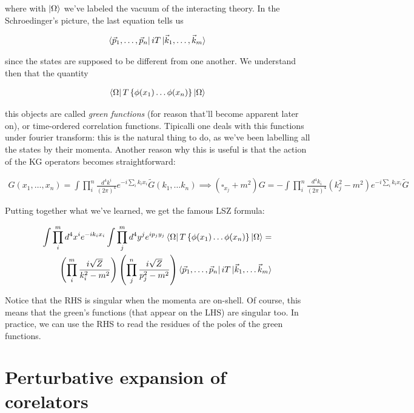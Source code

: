 \documentclass{report}
\begin{document}
where with \(\ket{\Omega}\) we've labeled the vacuum of the interacting theory. In the Schroedinger's picture, the last equation tells us 

\begin{align}
    \bra{\vec{p}_1, \ldots, \vec{p}_n}iT\ket{\vec{k}_1, \ldots, \vec{k}_m}
\end{align}

since the states are supposed to be different from one another. We understand then that the quantity 

\begin{align}
    \bra{\Omega}T\left\{\phi(x_1)\ldots \phi(x_n) \right\}\ket{\Omega}
\end{align}

this objects are called \emph{green functions} (for reason that'll become apparent later on), or time-ordered correlation functions. Tipicalli one deals with this functions under fourier transform: this is the natural thing to do, as we've been labelling all the states by their momenta. Another reason why this is useful is that the action of the KG operators becomes straightforward: 

\begin{align}
    G(x_1, \ldots, x_n) = \int \prod_i^n \frac{d^4k^i}{(2\pi)^4}e^{-i\sum_i k_ix_i}\tilde{G}(k_1, \ldots k_n) \implies (\square_{x_j}+m^2)G = -\int \prod_i^n \frac{d^4k_i}{(2\pi)^4}(k_j^2-m^2)e^{-i\sum_ik_ix_i}\tilde{G}
\end{align}

Putting together what we've learned, we get the famous LSZ formula: 

\begin{align}
    \int \prod_i^m d^4x^i e^{-ik_ix_i}\int \prod_j^m d^4y^j e^{ip_jy_j} \bra{\Omega}T\left\{\phi(x_1)\ldots \phi(x_n) \right\}\ket{\Omega} = \\
    \left(\prod_i^m \frac{i\sqrt{Z}}{k_i^2-m^2} \right)\left(\prod_j^n \frac{i\sqrt{Z}}{p_j^2-m^2} \right)\bra{\vec{p}_1, \ldots, \vec{p}_n}iT\ket{\vec{k}_1, \ldots \vec{k}_m}
\end{align}

Notice that the RHS is singular when the momenta are on-shell. Of course, this means that the green's functions (that appear on the LHS) are singular too. In practice, we can use the RHS to read the residues of the poles of the green functions. 

\section{Perturbative expansion of corelators}
\end{document}
